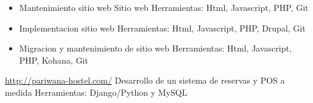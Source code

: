\documentclass[11pt,a4paper]{moderncv}
\begin{document}
{\begin{itemize}
            \newline{}
        \item Mantenimiento sitio web
            \newline{}
            Sitio web
            \newline{}
            Herramientas: Html, Javascript, PHP, Git
            \newline{}
        \item Implementacion sitio web
            \newline{}
            Herramientas: Html, Javascript, PHP, Drupal, Git
            \newline{}
        \item Migracion y mantenimiento de sitio web
            \newline{}
            Herramientas: Html, Javascript, PHP, Kohana, Git
            \newline{}
    \end{itemize}
}

{
    \url{http://pariwana-hostel.com/}
    \newline{}
    Desarrollo de un sistema de reservas y POS a medida
    \newline{}
    Herramientas: Django/Python y MySQL
}

\end{document}
